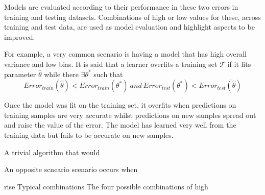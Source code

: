  
 Models are evaluated according to their performance in these two errors in training and testing datasets. Combinations of high or low values for these, across training and test data, are used as model evaluation and highlight aspects to be improved. 
 
 For example, a very common scenario is having a model that has high overall variance and low bias. 
 It is said that a learner overfits a training set $\mathcal{T}$ if it fits parameter $\hat{\theta}$ while there $\exists \theta^*$ such that
 \begin{equation} \label{eq:overfitting}
 Error_{train}(\hat{\theta}) < Error_{train}(\theta^*) \  and \ Error_{test}(\theta^*) < Error_{test}(\hat{\theta})   
 \end{equation}
 
 Once the model was fit on the training set, it overfits when predictions on training samples are very accurate whilst predictions on new samples spread out and raise the value of the error. The model has learned very well from the training data but fails to be accurate on new samples.
 
 A trivial algorithm that would 
 
 An opposite scneario scenario occurs when
 
 
 rise Typical combinations
 The four possible combinations of high 
 

